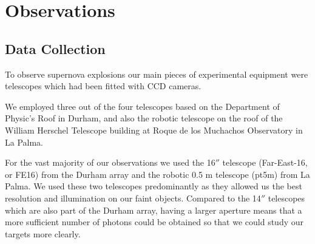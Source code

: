 \documentclass[twocolumn]{revtex4}
\begin{document}


\vspace{-3ex}
\section{Observations} 
\label{obsver}
\vspace{-2ex}
\subsection{Data Collection}
\label{observer-collection}
\vspace{-2ex}
To observe supernova explosions our main pieces of experimental equipment were telescopes which had been fitted with CCD cameras.

We employed three out of the four telescopes based on the Department of Physic's Roof in Durham, and also the robotic telescope on the roof of the William Herschel Telescope building at Roque de los Muchachos Observatory in La Palma.

For the vast majority of our observations we used the 16$''$ telescope (Far-East-16, or FE16) from the Durham array and the robotic 0.5 m telescope (pt5m) from La Palma. We used these two telescopes predominantly as they allowed us the best resolution and illumination on our faint objects. Compared to the 14$''$ telescopes which are also part of the Durham array, having a larger aperture means that a more sufficient number of photons could be obtained so that we could study our targets more clearly. 
\end{document}
